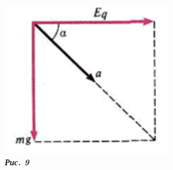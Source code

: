 



% 
    
\begin{figure}[H]
    
    \begin{subfigure}[b]{0.3\textwidth}
        \centering
        \includegraphics[width=\textwidth]{pic9.png}
        \captionsetup{labelformat=empty,justification=raggedright,singlelinecheck=false}
        \caption{\textbf{\textit{Рис. 9}}}
    \end{subfigure}
    \hfill
    \begin{subfigure}[b]{0.3\textwidth}
        \centering

\end{subfigure}
\end{figure}
